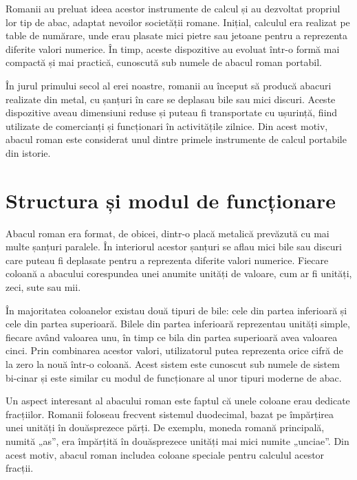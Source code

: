 \documentclass[12pt,a4paper]{article}
\begin{document}
Romanii au preluat ideea acestor instrumente de calcul și au dezvoltat propriul lor tip de abac, adaptat nevoilor societății romane. Inițial, calculul era realizat pe table de numărare, unde erau plasate mici pietre sau jetoane pentru a reprezenta diferite valori numerice. În timp, aceste dispozitive au evoluat într-o formă mai compactă și mai practică, cunoscută sub numele de abacul roman portabil. \cite{romanhandabacus}

În jurul primului secol al erei noastre, romanii au început să producă abacuri realizate din metal, cu șanțuri în care se deplasau bile sau mici discuri. Aceste dispozitive aveau dimensiuni reduse și puteau fi transportate cu ușurință, fiind utilizate de comercianți și funcționari în activitățile zilnice. Din acest motiv, abacul roman este considerat unul dintre primele instrumente de calcul portabile din istorie. \cite{romanabacuswiki}

\section*{Structura și modul de funcționare}

Abacul roman era format, de obicei, dintr-o placă metalică prevăzută cu mai multe șanțuri paralele. În interiorul acestor șanțuri se aflau mici bile sau discuri care puteau fi deplasate pentru a reprezenta diferite valori numerice. Fiecare coloană a abacului corespundea unei anumite unități de valoare, cum ar fi unități, zeci, sute sau mii. \cite{romanhandabacus}

În majoritatea coloanelor existau două tipuri de bile: cele din partea inferioară și cele din partea superioară. Bilele din partea inferioară reprezentau unități simple, fiecare având valoarea unu, în timp ce bila din partea superioară avea valoarea cinci. Prin combinarea acestor valori, utilizatorul putea reprezenta orice cifră de la zero la nouă într-o coloană. Acest sistem este cunoscut sub numele de sistem bi-cinar și este similar cu modul de funcționare al unor tipuri moderne de abac. \cite{ancientcomputers}

Un aspect interesant al abacului roman este faptul că unele coloane erau dedicate fracțiilor. Romanii foloseau frecvent sistemul duodecimal, bazat pe împărțirea unei unități în douăsprezece părți. De exemplu, moneda romană principală, numită „as”, era împărțită în douăsprezece unități mai mici numite „unciae”. Din acest motiv, abacul roman includea coloane speciale pentru calculul acestor fracții. \cite{romanabacuswiki}
\end{document}
